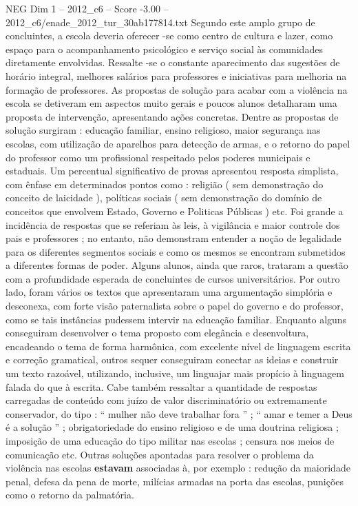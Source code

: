 \begin{textsample}{NEG Dim 1 – 2012\_c6 – Score -3.00 – 2012\_c6/enade\_2012\_tur\_30ab177814.txt}
Segundo este amplo grupo de concluintes, a escola deveria oferecer -se como centro de cultura e lazer, como espaço para o acompanhamento psicológico e serviço social às comunidades diretamente envolvidas.
Ressalte -se o constante aparecimento das sugestões de horário integral, melhores salários para professores e iniciativas para melhoria na formação de professores.
As propostas de solução para acabar com a violência na escola se detiveram em aspectos muito gerais e poucos alunos detalharam uma proposta de intervenção, apresentando ações concretas.
Dentre as propostas de solução surgiram : educação familiar, ensino religioso, maior segurança nas escolas, com utilização de aparelhos para detecção de armas, e o retorno do papel do professor como um profissional respeitado pelos poderes municipais e estaduais.
Um percentual significativo de provas apresentou resposta simplista, com ênfase em determinados pontos como : religião ( sem demonstração do conceito de laicidade ), políticas sociais ( sem demonstração do domínio de conceitos que envolvem Estado, Governo e Politicas Públicas ) etc.
Foi grande a incidência de respostas que se referiam às leis, à vigilância e maior controle dos pais e professores ; no entanto, não demonstram entender a noção de legalidade para os diferentes segmentos sociais e como os mesmos se encontram submetidos a diferentes formas de poder.
Alguns alunos, ainda que raros, trataram a questão com a profundidade esperada de concluintes de cursos universitários.
Por outro lado, foram vários os textos que apresentaram uma argumentação simplória e desconexa, com forte visão paternalista sobre o papel do governo e do professor, como se tais instâncias pudessem intervir na educação familiar.
Enquanto alguns conseguiram desenvolver o tema proposto com elegância e desenvoltura, encadeando o tema de forma harmônica, com excelente nível de linguagem escrita e correção gramatical, outros sequer conseguiram conectar as ideias e construir um texto razoável, utilizando, inclusive, um linguajar mais propício à linguagem falada do que à escrita.
Cabe também ressaltar a quantidade de respostas carregadas de conteúdo com juízo de valor discriminatório ou extremamente conservador, do tipo : “ mulher não deve trabalhar fora ” ; “ amar e temer a Deus é a solução ” ; obrigatoriedade do ensino religioso e de uma doutrina religiosa ; imposição de uma educação do tipo militar nas escolas ; censura nos meios de comunicação etc.
Outras soluções apontadas para resolver o problema da violência nas escolas \textbf{estavam} associadas à, por exemplo : redução da maioridade penal, defesa da pena de morte, milícias armadas na porta das escolas, punições como o retorno da palmatória.

\end{textsample}

